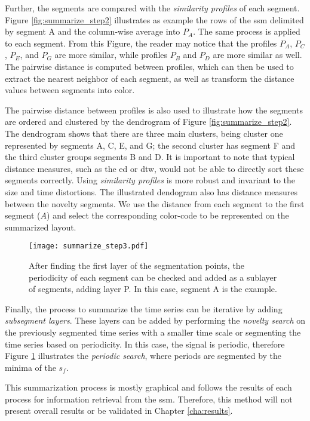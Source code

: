 Further, the segments are compared with the \textit{similarity profiles} of each segment. Figure \ref{fig:summarize_step2} illustrates as example the rows of the \gls{ssm} delimited by segment A and the column-wise average into $P_A$. The same process is applied to each segment. From this Figure, the reader may notice that the profiles $P_A$, $P_C$, $P_E$, and $P_G$ are more similar, while profiles $P_B$ and $P_D$ are more similar as well. The pairwise distance is computed between profiles, which can then be used to extract the nearest neighbor of each segment, as well as transform the distance values between segments into color. 
\par
The pairwise distance between profiles is also used to illustrate how the segments are ordered and clustered by the dendrogram of Figure \ref{fig:summarize_step2}. The dendrogram shows that there are three main clusters, being cluster one represented by segments A, C, E, and G; the second cluster has segment F and the third cluster groups segments B and D. It is important to note that typical distance measures, such as the \gls{ed} or \gls{dtw}, would not be able to directly sort these segments correctly. Using \textit{similarity profiles} is more robust and invariant to the size and time distortions. The illustrated dendogram also has distance measures between the novelty segments. We use the distance from each segment to the first segment ($A$) and select the corresponding color-code to be represented on the summarized layout. 

\begin{figure}
\centering
\texttt{[image: summarize\_step3.pdf]}
\caption{After finding the first layer of the segmentation points, the periodicity of each segment can be checked and added as a sublayer of segments, adding layer P. In this case, segment A is the example.}
\label{fig:summarize_step3}
\end{figure}

Finally, the process to summarize the time series can be iterative by adding \textit{subsegment layers}. These layers can be added by performing the \textit{novelty search} on the previously segmented time series with a smaller time scale or segmenting the time series based on periodicity. In this case, the signal is periodic, therefore Figure \ref{fig:summarize_step3} illustrates the \textit{periodic search}, where periods are segmented by the minima of the $s_f$.
\par
This summarization process is mostly graphical and follows the results of each process for information retrieval from the \gls{ssm}. Therefore, this method will not present overall results or be validated in Chapter \ref{cha:results}.
